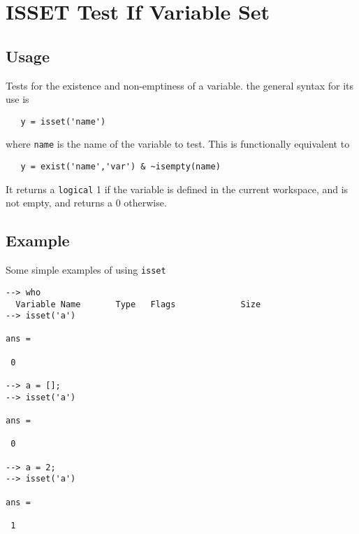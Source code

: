 \section{ISSET Test If Variable Set}

\subsection{Usage}

Tests for the existence and non-emptiness of a variable.
the general syntax for its use is
\begin{verbatim}
   y = isset('name')
\end{verbatim}
where \verb|name| is the name of the variable to test.  This
is functionally equivalent to 
\begin{verbatim}
   y = exist('name','var') & ~isempty(name)
\end{verbatim}
It returns a \verb|logical| 1 if the variable is defined 
in the current workspace, and is not empty, and returns
a 0 otherwise.
\subsection{Example}

Some simple examples of using \verb|isset|
\begin{verbatim}
--> who
  Variable Name       Type   Flags             Size
--> isset('a')

ans = 

 0 

--> a = [];
--> isset('a')

ans = 

 0 

--> a = 2;
--> isset('a')

ans = 

 1 
\end{verbatim}
